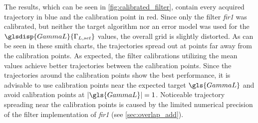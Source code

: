 \documentclass[12pt,a4paper,parskip=full,abstract=true,BCOR=12mm]{scrreprt}
\providecommand{\abs}[1]{\lvert#1\rvert}
\def\device#1{\mbox{\textit{#1}}}
\begin{document}
The results, which can be seen in \cref{fig:calibrated_filter}, contain every acquired
trajectory in blue and the calibration point in red. Since only the filter \device{fir1}
was calibrated, but neither the target algorithm nor an error model was used for the
$\glsdisp{GammaL}{\Gamma_{L,set}}$ values, the overall grid is slightly distorted. As can be seen in these
smith charts, the trajectories spread out at points far away from the calibration points.
As expected, the filter calibrations utilizing the mean values achieve better trajectories
between the calibration points. Since the trajectories around the calibration points
show the best performance, it is advisable to use calibration points near the expected
target $\gls{GammaL}$ and avoid calibration points at $\abs{\gls{GammaL}} = 1$. Noticeable
trajectory spreading near the calibration points is caused by the limited numerical
precision of the filter implementation of \device{fir1} (see \cref{sec:overlap_add}).
\end{document}

